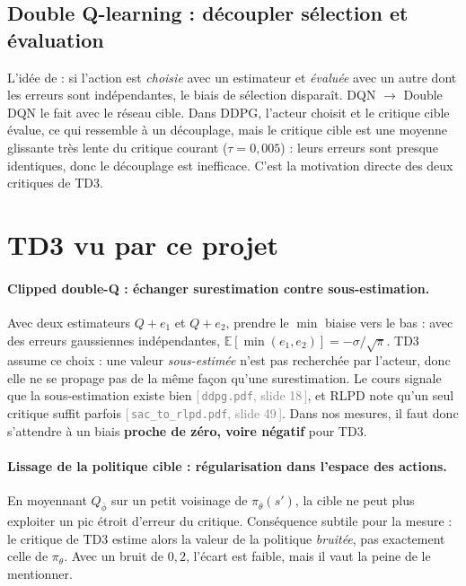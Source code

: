 \documentclass[11pt,a4paper]{article}
\newcommand{\E}{\mathbb{E}}
\newcommand{\code}[1]{\texttt{#1}}
\newcommand{\slide}[2]{\textcolor{gray}{[\,\code{#1}, slide #2\,]}}
\begin{document}
\subsection{Double Q-learning : découpler sélection et évaluation}
L'idée de \citet{vanhasselt2010double} : si l'action est \emph{choisie} avec un estimateur et
\emph{évaluée} avec un autre dont les erreurs sont indépendantes, le biais de sélection disparaît.
DQN $\to$ Double DQN le fait avec le réseau cible. Dans DDPG, l'acteur choisit et le critique cible
évalue, ce qui ressemble à un découplage, mais le critique cible est une moyenne glissante très
lente du critique courant ($\tau=0{,}005$) : leurs erreurs sont presque identiques, donc le
découplage est inefficace. C'est la motivation directe des deux critiques de TD3.

\section{TD3 vu par ce projet}

\paragraph{Clipped double-Q : échanger surestimation contre sous-estimation.} Avec deux estimateurs
$Q + e_1$ et $Q + e_2$, prendre le $\min$ biaise vers le bas : avec des erreurs gaussiennes
indépendantes, $\E[\min(e_1,e_2)] = -\sigma/\sqrt\pi$. TD3 assume ce choix : une valeur
\emph{sous-estimée} n'est pas recherchée par l'acteur, donc elle ne se propage pas de la même façon
qu'une surestimation. Le cours signale que la sous-estimation existe bien \slide{ddpg.pdf}{18}, et
RLPD note qu'un seul critique suffit parfois \slide{sac\_to\_rlpd.pdf}{49}. Dans nos mesures, il faut
donc s'attendre à un biais \textbf{proche de zéro, voire négatif} pour TD3.

\paragraph{Lissage de la politique cible : régularisation dans l'espace des actions.} En moyennant
$Q_{\bar\phi}$ sur un petit voisinage de $\pi_{\bar\theta}(s')$, la cible ne peut plus exploiter un
pic étroit d'erreur du critique. Conséquence subtile pour la mesure : le critique de TD3 estime
alors la valeur de la politique \emph{bruitée}, pas exactement celle de $\pi_\theta$. Avec un bruit
de $0{,}2$, l'écart est faible, mais il vaut la peine de le mentionner.
\end{document}
